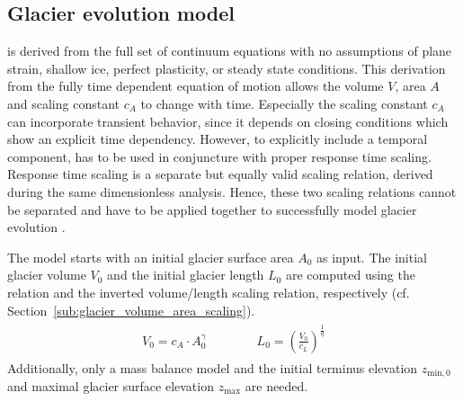 
    \subsection{Glacier evolution model} %
    \label{sub:glacier_evolution_model}

        \Vas{} is derived from the full set of continuum equations with no assumptions of plane strain, shallow ice, perfect plasticity, or steady state conditions. This derivation from the fully time dependent equation of motion allows the volume $V$, area $A$ and scaling constant $c_A$ to change with time. Especially the scaling constant $c_A$ can incorporate transient behavior, since it depends on closing conditions which show an explicit time dependency. However, to explicitly include a temporal component, \vas{} has to be used in conjuncture with proper response time scaling. Response time scaling is a separate but equally valid scaling relation, derived during the same dimensionless analysis. Hence, these two scaling relations cannot be separated and have to be applied together to successfully model glacier evolution \citep{Bahr2015}.

        The \vas{} model starts with an initial glacier surface area $A_0$ as input. The initial glacier volume $V_0$ and the initial glacier length $L_0$ are computed using the \vas{} relation and the inverted volume/length scaling relation, respectively (cf. Section~\ref{sub:glacier_volume_area_scaling}).
        \begin{align}
            \begin{split}
                V_0 = c_A\cdot A_0^\gamma \qquad\qquad L_0 = \left(\frac{V_0}{c_L}\right)^\frac{1}{q}
            \end{split}
        \end{align}
        Additionally, only a mass balance model and the initial terminus elevation $z_{\text{min},0}$ and maximal glacier surface elevation $z_\text{max}$ are needed.

